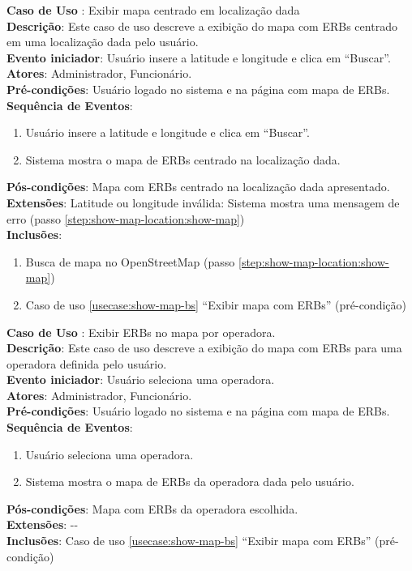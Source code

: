 \documentclass[]{politex}
\begin{document}
\noindent \textbf{Caso de Uso }: Exibir mapa centrado
em localização dada \\
\textbf{Descrição}: Este caso de uso descreve a exibição do mapa com ERBs
centrado em uma localização dada pelo usuário.  \\
\textbf{Evento iniciador}: Usuário insere a latitude e longitude e clica em
``Buscar''. \\
\textbf{Atores}: Administrador, Funcionário. \\
\textbf{Pré-condições}: Usuário logado no sistema e na página com mapa de
ERBs. \\
\textbf{Sequência de Eventos}:
\begin{enumerate}
\item Usuário insere a latitude e longitude e clica em ``Buscar''.
\item\label{step:show-map-location:show-map} Sistema mostra o mapa de ERBs
centrado na localização dada.
\end{enumerate}
\textbf{Pós-condições}: Mapa com ERBs centrado na localização dada
apresentado. \\
\textbf{Extensões}: Latitude ou longitude inválida: Sistema mostra uma mensagem
de erro (passo \ref{step:show-map-location:show-map}) \\
\textbf{Inclusões}:
\begin{enumerate}
\item Busca de mapa no OpenStreetMap (passo
\ref{step:show-map-location:show-map})
\item Caso de uso \ref{usecase:show-map-bs} ``Exibir mapa com ERBs''
(pré-condição)
\end{enumerate}

\noindent \textbf{Caso de Uso }: Exibir ERBs no
mapa por operadora. \\
\textbf{Descrição}: Este caso de uso descreve a exibição do mapa com ERBs para
uma operadora definida pelo usuário. \\
\textbf{Evento iniciador}: Usuário seleciona uma operadora. \\
\textbf{Atores}: Administrador, Funcionário. \\
\textbf{Pré-condições}: Usuário logado no sistema e na página com mapa de
ERBs. \\
\textbf{Sequência de Eventos}:
\begin{enumerate}
\item Usuário seleciona uma operadora.
\item Sistema mostra o mapa de ERBs da operadora dada pelo usuário.
\end{enumerate}
\textbf{Pós-condições}: Mapa com ERBs da operadora escolhida. \\
\textbf{Extensões}: -{}- \\
\textbf{Inclusões}: Caso de uso \ref{usecase:show-map-bs} ``Exibir mapa com
ERBs'' (pré-condição) \\
\end{document}
